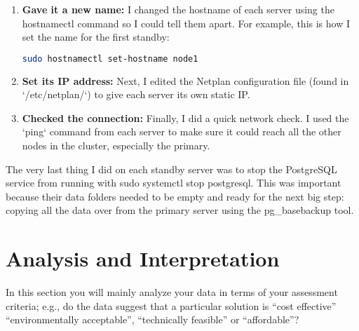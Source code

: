 \documentclass[conference]{IEEEtran}
\begin{document}
\begin{enumerate}
\item \textbf{Gave it a new name:} I changed the hostname of each server using the hostnamectl command so I could tell them apart. For example, this is how I set the name for the first standby:
\begin{lstlisting}[language=bash, caption={Setting the hostname for node1}]
sudo hostnamectl set-hostname node1
\end{lstlisting}

\item \textbf{Set its IP address:} Next, I edited the Netplan configuration file (found in `/etc/netplan/`) to give each server its own static IP.

\item \textbf{Checked the connection:} Finally, I did a quick network check. I used the `ping` command from each server to make sure it could reach all the other nodes in the cluster, especially the primary.

\end{enumerate}

The very last thing I did on each standby server was to stop the PostgreSQL service from running with sudo systemctl stop postgresql. This was important because their data folders needed to be empty and ready for the next big step: copying all the data over from the primary server using the pg\_basebackup tool.

%

\section{Analysis and Interpretation}
 In this section you will mainly analyze your data in terms of your assessment criteria; e.g., do the data suggest that a particular solution is ``cost effective'' ``environmentally acceptable'', ``technically feasible'' or ``affordable''?
   
\end{document}
